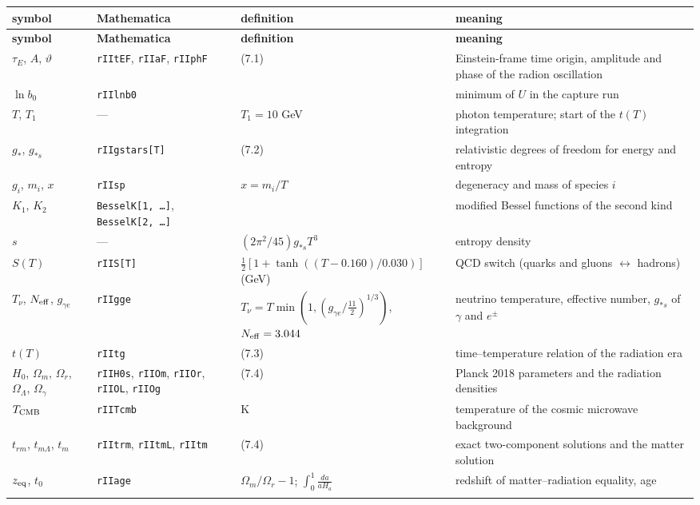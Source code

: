 \documentclass[10pt,a4paper]{article}
\begin{document}
{\small
\begin{longtable}{>{\raggedright\arraybackslash}p{}>{\raggedright\arraybackslash}p{}>{\raggedright\arraybackslash}p{}>{\raggedright\arraybackslash}p{}}
\toprule
\textbf{symbol} & \textbf{Mathematica} & \textbf{definition} & \textbf{meaning} \\
\midrule\endfirsthead
\toprule
\textbf{symbol} & \textbf{Mathematica} & \textbf{definition} & \textbf{meaning} \\
\midrule\endhead
\endfoot
\bottomrule\endlastfoot
$\tau_E$, $A$, $\vartheta$ & \texttt{rIItEF}, \texttt{rIIaF}, \texttt{rIIphF} & (7.1) & Einstein-frame time origin, amplitude and phase of the radion oscillation \\
$\ln b_0$ & \texttt{rIIlnb0} &  & minimum of $U$ in the capture run \\
$T$, $T_1$ & — & $T_1=10$ GeV & photon temperature; start of the $t(T)$ integration \\
$g_*$, $g_{*s}$ & \texttt{rIIgstars[T]} & (7.2) & relativistic degrees of freedom for energy and entropy \\
$g_i$, $m_i$, $x$ & \texttt{rIIsp} & $x=m_i/T$ & degeneracy and mass of species $i$ \\
$K_1$, $K_2$ & \texttt{BesselK[1, …]}, \texttt{BesselK[2, …]} &  & modified Bessel functions of the second kind \\
$s$ & — & $(2\pi^2/45)g_{*s}T^3$ & entropy density \\
$S(T)$ & \texttt{rIIS[T]} & $\tfrac12[1+\tanh((T-0.160)/0.030)]$ (GeV) & QCD switch (quarks and gluons \texorpdfstring{\ensuremath{\leftrightarrow}}{↔} hadrons) \\
$T_\nu$, $N_{\rm eff}$, $g_{\gamma e}$ & \texttt{rIIgge} & $T_\nu=T\min(1,(g_{\gamma e}/\tfrac{11}2)^{1/3})$, $N_{\rm eff}=3.044$ & neutrino temperature, effective number, $g_{*s}$ of $\gamma$ and $e^\pm$ \\
$t(T)$ & \texttt{rIItg} & (7.3) & time–temperature relation of the radiation era \\
$H_0$, $\Omega_m$, $\Omega_r$, $\Omega_\Lambda$, $\Omega_\gamma$ & \texttt{rIIH0s}, \texttt{rIIOm}, \texttt{rIIOr}, \texttt{rIIOL}, \texttt{rIIOg} & (7.4) & Planck 2018 parameters and the radiation densities \\
$T_{\rm CMB}$ & \texttt{rIITcmb} & 2.7255 K & temperature of the cosmic microwave background \\
$t_{rm}$, $t_{m\Lambda}$, $t_m$ & \texttt{rIItrm}, \texttt{rIItmL}, \texttt{rIItm} & (7.4) & exact two-component solutions and the matter solution \\
$z_{\rm eq}$, $t_0$ & \texttt{rIIage} & $\Omega_m/\Omega_r-1$; $\int_0^1\frac{da}{aH_a}$ & redshift of matter–radiation equality, age \\*
\end{longtable}}
\end{document}
